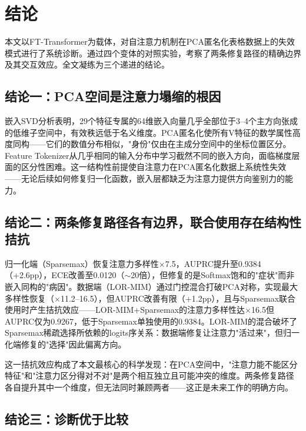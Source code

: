 
\section{结论}
\label{sec:conclusion}

本文以FT-Transformer为载体，对自注意力机制在PCA匿名化表格数据上的失效模式进行了系统诊断。通过四个变体的对照实验，考察了两条修复路径的精确边界及其交互效应。全文凝练为三个递进的结论。

\subsection{结论一：PCA空间是注意力塌缩的根因}

嵌入SVD分析表明，29个特征专属的64维嵌入向量几乎全部位于3--4个主方向张成的低维子空间中，有效秩远低于名义维度。PCA匿名化使所有V特征的数学属性高度同构——它们的数值分布相似，"身份"仅由在主成分空间中的坐标位置区分。Feature Tokenizer从几乎相同的输入分布中学习截然不同的嵌入方向，面临梯度层面的区分性困难。这一结构性前提使自注意力在PCA匿名化数据上系统性失效——无论后续如何修复归一化函数，嵌入层都缺乏为注意力提供方向鉴别力的能力。

\subsection{结论二：两条修复路径各有边界，联合使用存在结构性拮抗}

归一化端（Sparsemax）恢复注意力多样性$\times$7.5，AUPRC提升至0.9384（+2.6pp），ECE改善至0.0120（$\sim$20倍），但修复的是Softmax饱和的"症状"而非嵌入同构的"病因"。数据端（LOR-MIM）通过门控混合打破PCA对称，实现最大多样性恢复（$\times$11.2--16.5），但AUPRC改善有限（+1.2pp），且与Sparsemax联合使用时产生拮抗效应——LOR-MIM+Sparsemax的注意力多样性达$\times$16.5但AUPRC仅为0.9267，低于Sparsemax单独使用的0.9384。LOR-MIM的混合破坏了Sparsemax稀疏选择所依赖的logits序关系：数据端修复让注意力"活过来"，但归一化端修复的"选择"因此偏离方向。

这一拮抗效应构成了本文最核心的科学发现：在PCA空间中，"注意力能不能区分特征"和"注意力区分得对不对"是两个相互独立且可能冲突的维度。两条修复路径各自提升其中一个维度，但无法同时兼顾两者——这正是未来工作的明确方向。

\subsection{结论三：诊断优于比较}


